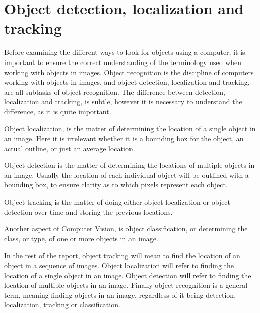 \section{Object detection, localization and tracking}
Before examining the different ways to look for objects using a computer, it is important to ensure the correct understanding of the terminology used when working with objects in images.
Object recognition is the discipline of computers working with objects in images, and object detection, localization and tracking, are all subtasks of object recognition.
The difference between detection, localization and tracking, is subtle, however it is necessary to understand the difference, as it is quite important\cite{objecttrackdetect}.

Object localization, is the matter of determining the location of a single object in an image. 
Here it is irrelevant whether it is a bounding box for the object, an actual outline, or just an average location.

Object detection is the matter of determining the locations of multiple objects in an image.
Usually the location of each individual object will be outlined with a bounding box, to ensure clarity as to which pixels represent each object.

Object tracking is the matter of doing either object localization or object detection over time and storing the previous locations.

Another aspect of Computer Vision, is object classification, or determining the class, or type, of one or more objects in an image.

In the rest of the report, object tracking will mean to find the location of an object in a sequence of images.
Object localization will refer to finding the location of a single object in an image.
Object detection will refer to finding the location of multiple objects in an image.
Finally object recognition is a general term, meaning finding objects in an image, regardless of it being detection, localization, tracking or classification. 
